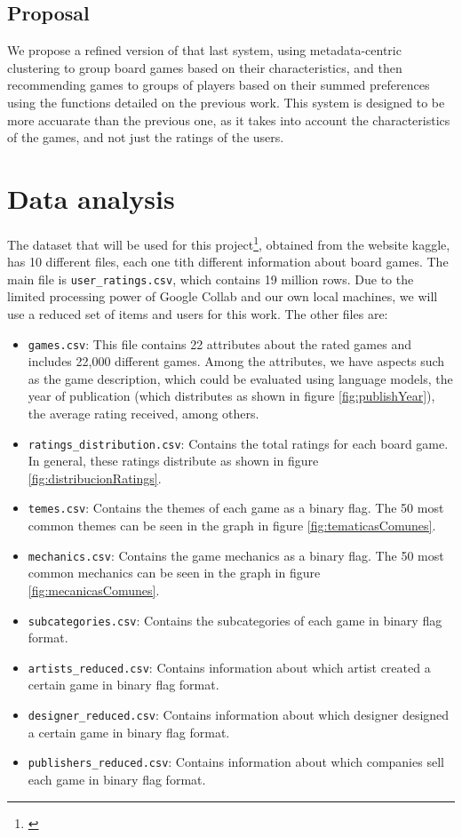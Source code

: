 \documentclass{article}
\begin{document}
\subsection{Proposal}

We propose a refined version of that last system, using metadata-centric clustering to group board games based on their characteristics, and then recommending games to groups of players based on their summed preferences using the functions detailed on the previous work. This system is designed to be more accuarate than the previous one, as it takes into account the characteristics of the games, and not just the ratings of the users.

\section{Data analysis}

The dataset that will be used for this project\footnote{\cite{board_games_kaggle}}, obtained from the website kaggle, has 10 different files, each one tith different information about board games. The main file is \texttt{user\_ratings.csv}, which contains 19 million rows. Due to the limited processing power of Google Collab and our own local machines, we will use a reduced set of items and users for this work. The other files are:

\begin{itemize}
    \item \texttt{games.csv}: This file contains 22 attributes about the rated games and includes 22,000 different games. Among the attributes, we have aspects such as the game description, which could be evaluated using language models, the year of publication (which distributes as shown in figure \ref{fig:publishYear}), the average rating received, among others.
    \item \texttt{ratings\_distribution.csv}: Contains the total ratings for each board game. In general, these ratings distribute as shown in figure \ref{fig:distribucionRatings}.
    \item \texttt{temes.csv}: Contains the themes of each game as a binary flag. The 50 most common themes can be seen in the graph in figure \ref{fig:tematicasComunes}.
    \item \texttt{mechanics.csv}: Contains the game mechanics as a binary flag. The 50 most common mechanics can be seen in the graph in figure \ref{fig:mecanicasComunes}.
    \item \texttt{subcategories.csv}: Contains the subcategories of each game in binary flag format.
    \item \texttt{artists\_reduced.csv}: Contains information about which artist created a certain game in binary flag format.
    \item \texttt{designer\_reduced.csv}: Contains information about which designer designed a certain game in binary flag format.
    \item \texttt{publishers\_reduced.csv}: Contains information about which companies sell each game in binary flag format.
          
\end{itemize}
\end{document}
